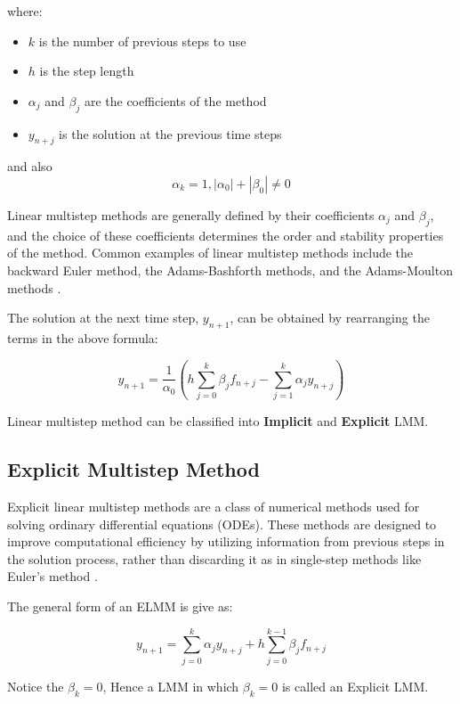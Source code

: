 \documentclass[a4paper, twoside]{report} %
\begin{document}
	where:


	\begin{itemize}
		\item \(k\) is the number of previous steps to use
		\item \(h\) is the step length
		\item \(\alpha_j\) and \(\beta_j\) are the coefficients of the method
		\item \(y_{n+j}\) is the solution at the previous time steps
	\end{itemize}


	and also \[\alpha_k = 1, |\alpha_0| +| \beta_0 | \neq 0 \]

	Linear multistep methods are generally defined by their coefficients \(\alpha_j\) and \(\beta_j\), and the choice of these coefficients determines the order and stability properties of the method. Common examples of linear multistep methods include the backward Euler method, the Adams-Bashforth methods, and the Adams-Moulton methods \cite{lambert1977}.


	The solution at the next time step, \(y_{n+1}\), can be obtained by rearranging the terms in the above formula:


	\begin{equation}
		y_{n+1} = \frac{1}{\alpha_0} \left(h \sum_{j=0}^{k} \beta_j f_{n+j} - \sum_{j=1}^{k} \alpha_j y_{n+j}\right)
	\end{equation}


	Linear multistep method can be classified into \textbf{Implicit} and \textbf{Explicit} LMM.


	\subsection{Explicit Multistep Method}
	Explicit linear multistep methods are a class of numerical methods used for solving ordinary differential equations (ODEs). These methods are designed to improve computational efficiency by utilizing information from previous steps in the solution process, rather than discarding it as in single-step methods like Euler's method \cite{enwiki:1182900519}.

	The general form of an ELMM is give as:

	\begin{equation}
		y_{n+1} = \sum_{j=0}^{k} \alpha_j y_{n+j} + h \sum_{j=0}^{k-1} \beta_j f_{n+j}
	\end{equation}

	Notice the $\beta_k = 0$, Hence a LMM in which $\beta_k = 0$ is called an Explicit LMM.
\end{document}
